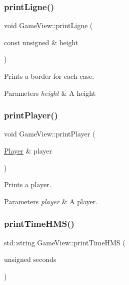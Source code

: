 \subsubsection{\texorpdfstring{print\+Ligne()}{printLigne()}}
{\footnotesize\ttfamily void Game\+View\+::print\+Ligne (\begin{DoxyParamCaption}\item[{const unsigned \&}]{height }\end{DoxyParamCaption})}



Prints a border for each case. 


\begin{DoxyParams}{Parameters}
{\em height} & A height \\
\hline
\end{DoxyParams}
\mbox{\label{class_game_view_adf8a4163d1c1d57b320d8581d4065d13}} 
\subsubsection{\texorpdfstring{print\+Player()}{printPlayer()}}
{\footnotesize\ttfamily void Game\+View\+::print\+Player (\begin{DoxyParamCaption}\item[{\hyperlink{class_player}{Player} \&}]{player }\end{DoxyParamCaption})}



Prints a player. 


\begin{DoxyParams}{Parameters}
{\em player} & A player. \\
\hline
\end{DoxyParams}
\mbox{\label{class_game_view_ab66a806d28193eacb94ac3aee388c8dd}} 
\subsubsection{\texorpdfstring{print\+Time\+H\+M\+S()}{printTimeHMS()}}
{\footnotesize\ttfamily std\+::string Game\+View\+::print\+Time\+H\+MS (\begin{DoxyParamCaption}\item[{unsigned}]{seconds }\end{DoxyParamCaption})}



